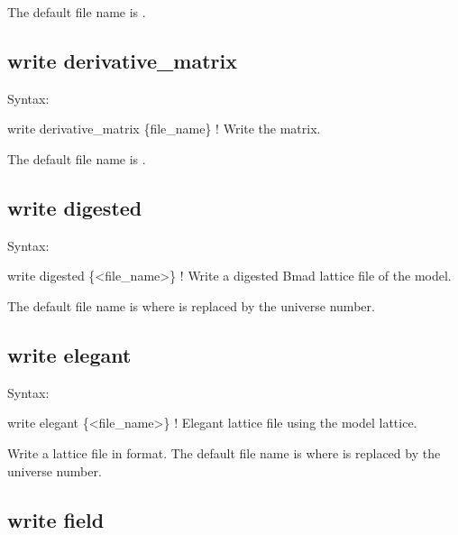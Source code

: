 {{{{{{{{{{{The default file name is .


\subsection{write derivative_matrix}
\label{s:write.deriv.matrix}

Syntax:
\begin{example}
    write derivative_matrix \{file_name\}    ! Write the  matrix.
\end{example}

The default file name is . 


\subsection{write digested}
\label{s:write.digested}

Syntax:
\begin{example}
    write digested \{<file_name>\}      ! Write a digested Bmad lattice file of the model.
\end{example}

The default file name is  where \vn{\#} is replaced by the universe number. 



\subsection{write elegant}
\label{s:write.elegant}

Syntax:
\begin{example}
    write elegant \{<file_name>\}           ! Elegant lattice file using the model lattice.
\end{example}

Write a lattice file in  format. The default file name is  where \vn{\#}
is replaced by the universe number.


\subsection{write field}
\label{s:write.field}

}}}}}}}}}}}
